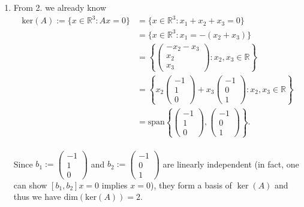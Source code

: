 {\begin{enumerate}
	$$\text{rank}(A) := \dim\text{Im}(A) = 1.$$ 
	(Note that two equal vectors $x = y$ are linearly dependent and that a single nonzero vector $x \neq 0$ is linearly independent.)
	\item 
	From 2. we already know 
	\begin{align*}
	 \text{ker}(A) := \{x\in\mathbb{R}^3\colon Ax = 0 \} &= \{x\in\mathbb{R}^3\colon x_1+x_2+x_3 = 0 \} \\
	 &=  \{x\in\mathbb{R}^3\colon x_1=-(x_2+x_3) \}   \\
	 &  = \left \lbrace \begin{pmatrix}
	 - x_2-x_3 \\ x_2\\x_3 
	 \end{pmatrix}\colon x_2, x_3 \in \mathbb{R} \right\rbrace \\
	 &  = \left \lbrace 
	 x_2\begin{pmatrix}
	-1\\1\\0
	\end{pmatrix} 
	+x_3\begin{pmatrix}
	-1\\0\\1
	\end{pmatrix} 
	\colon x_2, x_3 \in \mathbb{R} \right\rbrace \\
	&= \text{span}\left\lbrace 	  \begin{pmatrix}
	-1\\1\\0
	\end{pmatrix} 
	,\begin{pmatrix}
	-1\\0\\1
	\end{pmatrix} \right\rbrace.
	\end{align*}  
~\\ 
	Since $b_1 := \begin{pmatrix}-1\\1\\0\end{pmatrix} $ and $b_2 := \begin{pmatrix}-1\\0\\1\end{pmatrix} $ are linearly independent (in fact, one can show $[b_1, b_2]x = 0$ implies  $x = 0$), they form a basis of $\ker(A)$ and thus we have $\text{dim}\left(\text{ker}(A)\right) = 2$.
\end{enumerate}
}